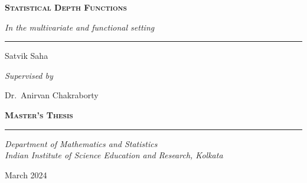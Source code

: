\begin{titlepage}
    \vspace*{4cm}


    {\noindent\Huge\scshape\bfseries
        Statistical Depth Functions
    }
    \vspace{0.5cm}

    {\noindent\LARGE\itshape
        In the multivariate and functional setting
    }
    \vspace{0.8cm}
    \hrule
    \vspace{0.8cm}

    {\noindent\Large Satvik Saha}
    \vspace{0.6cm}

    {\noindent\Large\itshape Supervised by}
    \vspace{0.1cm}

    {\noindent\Large Dr.~Anirvan Chakraborty}
    \vspace{0.5cm}

    \vfill

    \raggedleft
    {\noindent\large\scshape\bfseries Master's Thesis}
    \vspace{0.1cm}

    \rule{0.5\textwidth}{1pt}

    \vspace{0.2cm}

    {\noindent\large\itshape
        Department of Mathematics and Statistics \\
        Indian Institute of Science Education and Research, Kolkata \\
    }
    \vspace{0.8cm}

    {\noindent\large March 2024}

    \vspace*{1cm}
\end{titlepage}
